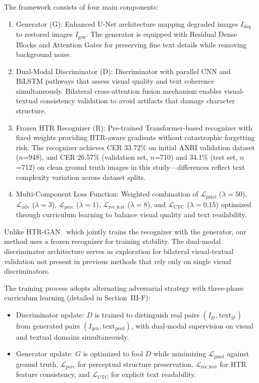 \documentclass[journal]{IEEEtran}
\begin{document}
The framework consists of four main components:

\begin{enumerate}
    \item Generator (G): Enhanced U-Net architecture mapping degraded images $I_{\text{deg}}$ to restored images $I_{\text{gen}}$. The generator is equipped with Residual Dense Blocks and Attention Gates for preserving fine text details while removing background noise.
    
    \item Dual-Modal Discriminator (D): Discriminator with parallel CNN and BiLSTM pathways that assess visual quality and text coherence simultaneously. Bilateral cross-attention fusion mechanism enables visual-textual consistency validation to avoid artifacts that damage character structure.
    
    \item Frozen HTR Recognizer (R): Pre-trained Transformer-based recognizer with fixed weights providing HTR-aware gradients without catastrophic forgetting risk. The recognizer achieves CER 33.72\% on initial ANRI validation dataset ($n$=948), and CER 26.57\% (validation set, $n$=710) and 34.1\% (test set, $n$=712) on clean ground truth images in this study—differences reflect text complexity variation across dataset splits.
    
    \item Multi-Component Loss Function: Weighted combination of $\mathcal{L}_{\text{pixel}}$ ($\lambda=50$), $\mathcal{L}_{\text{adv}}$ ($\lambda=3$), $\mathcal{L}_{\text{perc}}$ ($\lambda=1$), $\mathcal{L}_{\text{rec\_feat}}$ ($\lambda=8$), and $\mathcal{L}_{\text{CTC}}$ ($\lambda=0.15$) optimized through curriculum learning to balance visual quality and text readability.
\end{enumerate}

Unlike HTR-GAN~\cite{souibgui2021enhance} which jointly trains the recognizer with the generator, our method uses a frozen recognizer for training stability. The dual-modal discriminator architecture serves as exploration for bilateral visual-textual validation not present in previous methods that rely only on single visual discriminators.

The training process adopts alternating adversarial strategy with three-phase curriculum learning (detailed in Section~III-F):

\begin{itemize}
    \item Discriminator update: $D$ is trained to distinguish real pairs $(I_{\text{gt}}, \text{text}_{\text{gt}})$ from generated pairs $(I_{\text{gen}}, \text{text}_{\text{pred}})$, with dual-modal supervision on visual and textual domains simultaneously.
    
    \item Generator update: $G$ is optimized to fool $D$ while minimizing $\mathcal{L}_{\text{pixel}}$ against ground truth, $\mathcal{L}_{\text{perc}}$ for perceptual structure preservation, $\mathcal{L}_{\text{rec\_feat}}$ for HTR feature consistency, and $\mathcal{L}_{\text{CTC}}$ for explicit text readability.
\end{itemize}
\end{document}
